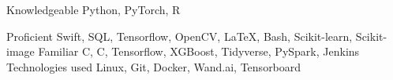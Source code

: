 \newcommand{\CS}{C\nolinebreak\hspace{-.05em}\raisebox{.6ex}{\scriptsize\bf \#}}
\newcommand{\CC}{C\nolinebreak\hspace{-.05em}\raisebox{.4ex}{\tiny\bf +}\nolinebreak\hspace{-.10em}\raisebox{.4ex}{\tiny\bf +}}
\def\CC{{C\nolinebreak[4]\hspace{-.05em}\raisebox{.4ex}{\tiny\bf ++}}}

\begin{cvskills}

  \cvskill
    {Knowledgeable} %
    {Python, PyTorch, R } %

  \cvskill
    {Proficient} %
    {Swift, SQL, Tensorflow, OpenCV, \LaTeX, Bash, Scikit-learn, Scikit-image}
  \cvskill
    {Familiar} %
    {\CS, \CC, Tensorflow, XGBoost, Tidyverse, PySpark, Jenkins}
  \cvskill
    {Technologies used} %
    {Linux,  Git, Docker, Wand.ai, Tensorboard} %
\end{cvskills}
